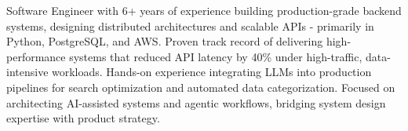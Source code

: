 \documentclass[11pt, a4paper]{awesome-cv}
\begin{document}
\makecvheader[C]



\begin{cvparagraph}
Software Engineer with 6+ years of experience building production-grade backend systems, designing distributed architectures and scalable APIs - primarily in Python, PostgreSQL, and AWS. Proven track record of delivering high-performance systems that reduced API latency by 40\% under high-traffic, data-intensive workloads. Hands-on experience integrating LLMs into production pipelines for search optimization and automated data categorization. Focused on architecting AI-assisted systems and agentic workflows, bridging system design expertise with product strategy.
\end{cvparagraph}

\end{document}
